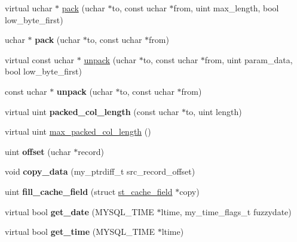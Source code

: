\begin{DoxyCompactItemize}
\item 
virtual uchar $\ast$ \mbox{\hyperlink{classField_a9eaff8d3425ef0e1da69b32cbd8f2879}{pack}} (uchar $\ast$to, const uchar $\ast$from, uint max\+\_\+length, bool low\+\_\+byte\+\_\+first)
\item 
\mbox{\label{classField_a306028e2e721480e3eb7e7bf3cc806cb}} 
uchar $\ast$ {\bfseries pack} (uchar $\ast$to, const uchar $\ast$from)
\item 
virtual const uchar $\ast$ \mbox{\hyperlink{classField_a42f448ff2c939d91949f7635d939b16b}{unpack}} (uchar $\ast$to, const uchar $\ast$from, uint param\+\_\+data, bool low\+\_\+byte\+\_\+first)
\item 
\mbox{\label{classField_a2cbe509d8c3a4a4f6286a7ee761358ec}} 
const uchar $\ast$ {\bfseries unpack} (uchar $\ast$to, const uchar $\ast$from)
\item 
\mbox{\label{classField_a44c877b783f890417c5a55e5c600e062}} 
virtual uint {\bfseries packed\+\_\+col\+\_\+length} (const uchar $\ast$to, uint length)
\item 
virtual uint \mbox{\hyperlink{classField_a05d15db9879fe9ae68415819b3dbf96f}{max\+\_\+packed\+\_\+col\+\_\+length}} ()
\item 
\mbox{\label{classField_a39d05da1abebc94febd137199132d089}} 
uint {\bfseries offset} (uchar $\ast$record)
\item 
\mbox{\label{classField_a7f8978abd3f5251085c3bb804d2a64ee}} 
void {\bfseries copy\+\_\+data} (my\+\_\+ptrdiff\+\_\+t src\+\_\+record\+\_\+offset)
\item 
\mbox{\label{classField_ad22c23686f78bc4209a55dd9105dee37}} 
uint {\bfseries fill\+\_\+cache\+\_\+field} (struct \mbox{\hyperlink{structst__cache__field}{st\+\_\+cache\+\_\+field}} $\ast$copy)
\item 
\mbox{\label{classField_ad077ce39dd8a76056886e13210b4cc37}} 
virtual bool {\bfseries get\+\_\+date} (M\+Y\+S\+Q\+L\+\_\+\+T\+I\+ME $\ast$ltime, my\+\_\+time\+\_\+flags\+\_\+t fuzzydate)
\item 
\mbox{\label{classField_af68f59fac0ddb69cacf1e157694ef117}} 
virtual bool {\bfseries get\+\_\+time} (M\+Y\+S\+Q\+L\+\_\+\+T\+I\+ME $\ast$ltime)

\end{DoxyCompactItemize}
